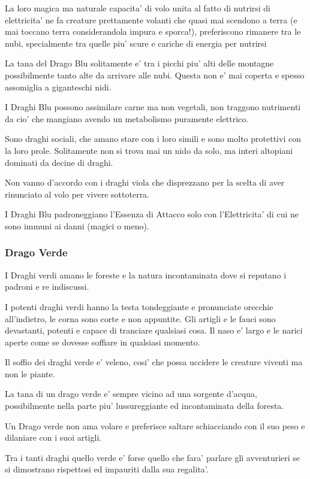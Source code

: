 \documentclass[a4paper,11pt,twoside,openany]{book}
\begin{document}
La loro magica ma naturale capacita' di volo unita al fatto di nutrirsi di elettricita' ne fa creature prettamente volanti che quasi mai scendono a terra (e mai toccano terra considerandola impura e sporca!), preferiscono rimanere tra le nubi, specialmente tra quelle piu' scure e cariche di energia per nutrirsi

La tana del Drago Blu solitamente e' tra i picchi piu' alti delle montagne possibilmente tanto alte da arrivare alle nubi. Questa non e' mai coperta e spesso assomiglia a giganteschi nidi.

I Draghi Blu possono assimilare carne ma non vegetali, non traggono nutrimenti da cio' che mangiano avendo un metabolismo puramente elettrico.

Sono draghi sociali, che amano stare con i loro simili e sono molto protettivi con la loro prole.
Solitamente non si trova mai un nido da solo, ma interi altopiani dominati da decine di draghi.

Non vanno d'accordo con i draghi viola che disprezzano per la scelta di aver rinunciato al volo per vivere sottoterra.

I Draghi Blu padroneggiano l'Essenza di Attacco solo con l'Elettricita' di cui ne sono immuni ai danni (magici o meno).


\subsubsection{Drago Verde} 

I Draghi verdi amano le foreste e la natura incontaminata dove si reputano i padroni e re indiscussi.

I potenti draghi verdi hanno la testa tondeggiante e pronunciate orecchie all'indietro, le corna sono corte e non appuntite.
Gli artigli e le fauci sono devastanti, potenti e capace di tranciare qualsiasi cosa.
Il naso e' largo e le narici aperte come se dovesse soffiare in qualsiasi momento.

Il soffio dei draghi verde e' veleno, cosi' che possa uccidere le creature viventi ma non le piante.

La tana di un drago verde e' sempre vicino ad una sorgente d'acqua, possibilmente nella parte piu' lussureggiante ed incontaminata della foresta.

Un Drago verde non ama volare e preferisce saltare schiacciando con il suo peso e dilaniare con i suoi artigli.

Tra i tanti draghi quello verde e' forse quello che fara' parlare gli avventurieri se si dimostrano rispettosi ed impauriti dalla sua regalita'.
\end{document}
